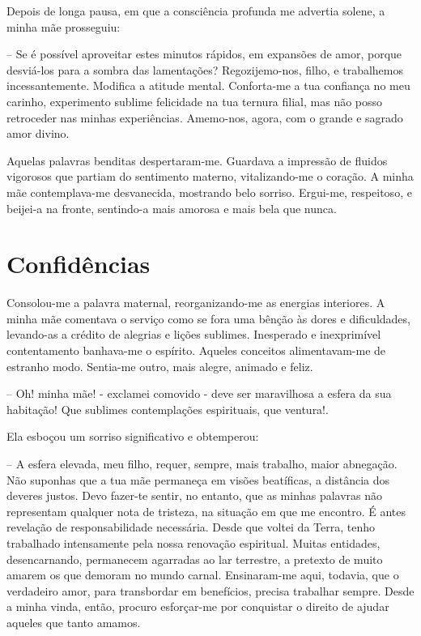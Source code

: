 \documentclass[portuguese,12pt,a4paper]{scrbook}
\begin{document}
	Depois de longa pausa, em que a consciência profunda me advertia solene, a minha mãe prosseguiu:
	
	– Se é possível aproveitar estes minutos rápidos, em expansões de amor, porque desviá-los para a sombra das lamentações? Regozijemo-nos, filho, e trabalhemos incessantemente. Modifica a atitude mental. Conforta-me a tua confiança no meu carinho, experimento sublime felicidade na tua ternura filial, mas não posso retroceder nas minhas experiências. Amemo-nos, agora, com o grande e sagrado amor divino.
	
	Aquelas palavras benditas despertaram-me. Guardava a impressão de fluidos vigorosos que partiam do sentimento materno, vitalizando-me o coração. A minha mãe contemplava-me desvanecida, mostrando belo sorriso. Ergui-me, respeitoso, e beijei-a na fronte, sentindo-a mais amorosa e mais bela que nunca.
	
	
	\chapter{Confidências}
	
	Consolou-me a palavra maternal, reorganizando-me as energias interiores. A minha mãe comentava o serviço como se fora uma bênção às dores e dificuldades, levando-as a crédito de alegrias e lições sublimes. Inesperado e inexprimível contentamento banhava-me o espírito. Aqueles conceitos alimentavam-me de estranho modo. Sentia-me outro, mais alegre, animado e feliz.
	
	– Oh! minha mãe! - exclamei comovido - deve ser maravilhosa a esfera da sua habitação! Que sublimes contemplações espirituais, que ventura!.
	
	Ela esboçou um sorriso significativo e obtemperou:
	
	– A esfera elevada, meu filho, requer, sempre, mais trabalho, maior abnegação. Não suponhas que a tua mãe permaneça em visões beatíficas, a distância dos deveres justos. Devo fazer-te sentir, no entanto, que as minhas palavras não representam qualquer nota de tristeza, na situação em que me encontro. É antes revelação de responsabilidade necessária. Desde que voltei da Terra, tenho trabalhado intensamente pela nossa renovação espiritual. Muitas entidades, desencarnando, permanecem agarradas ao lar terrestre, a pretexto de muito amarem os que demoram no mundo carnal. Ensinaram-me aqui, todavia, que o verdadeiro amor, para transbordar em benefícios, precisa trabalhar sempre. Desde a minha vinda, então, procuro esforçar-me por conquistar o direito de ajudar aqueles que tanto amamos.
	
\end{document}
